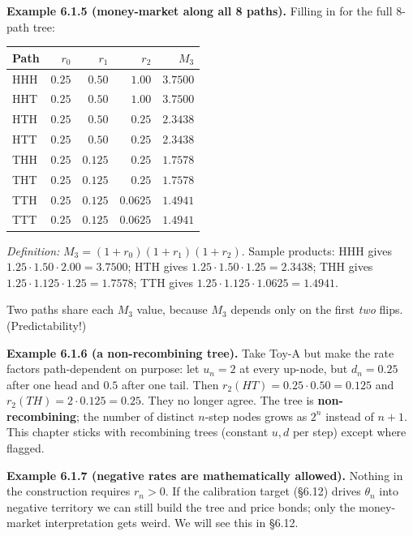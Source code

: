 \documentclass[
  10pt,
  twoside]{book}
\newcounter{none} %
\begin{document}
\textbf{Example 6.1.5 (money-market along all 8 paths).} Filling in for
the full 8-path tree:

{\def\LTcaptype{none} %
\begin{table}[H]
\centering
\begin{tabular}{|l|r|r|r|r|}
\toprule
Path & \(r_0\) & \(r_1\) & \(r_2\) & \(M_3\) \\
\midrule



HHH & \(0.25\) & \(0.50\) & \(1.00\) & \(3.7500\) \\
HHT & \(0.25\) & \(0.50\) & \(1.00\) & \(3.7500\) \\
HTH & \(0.25\) & \(0.50\) & \(0.25\) & \(2.3438\) \\
HTT & \(0.25\) & \(0.50\) & \(0.25\) & \(2.3438\) \\
THH & \(0.25\) & \(0.125\) & \(0.25\) & \(1.7578\) \\
THT & \(0.25\) & \(0.125\) & \(0.25\) & \(1.7578\) \\
TTH & \(0.25\) & \(0.125\) & \(0.0625\) & \(1.4941\) \\
TTT & \(0.25\) & \(0.125\) & \(0.0625\) & \(1.4941\) \\
\bottomrule
\end{tabular}
\end{table}
}

\emph{Definition:} \(M_3 = (1+r_0)(1+r_1)(1+r_2)\). Sample products: HHH
gives \(1.25 \cdot 1.50 \cdot 2.00 = 3.7500\); HTH gives
\(1.25 \cdot 1.50 \cdot 1.25 = 2.3438\); THH gives
\(1.25 \cdot 1.125 \cdot 1.25 = 1.7578\); TTH gives
\(1.25 \cdot 1.125 \cdot 1.0625 = 1.4941\).

Two paths share each \(M_3\) value, because \(M_3\) depends only on the
first \emph{two} flips. (Predictability!)

\textbf{Example 6.1.6 (a non-recombining tree).} Take Toy-A but make the
rate factors path-dependent on purpose: let \(u_n = 2\) at every
up-node, but \(d_n = 0.25\) after one head and \(0.5\) after one tail.
Then \(r_2(HT) = 0.25 \cdot 0.50 = 0.125\) and
\(r_2(TH) = 2 \cdot 0.125 = 0.25\). They no longer agree. The tree is
\textbf{non-recombining}; the number of distinct \(n\)-step nodes grows
as \(2^n\) instead of \(n+1\). This chapter sticks with recombining
trees (constant \(u, d\) per step) except where flagged.

\textbf{Example 6.1.7 (negative rates are mathematically allowed).}
Nothing in the construction requires \(r_n > 0\). If the calibration
target (§6.12) drives \(\theta_n\) into negative territory we can still
build the tree and price bonds; only the money-market interpretation
gets weird. We will see this in §6.12.
\end{document}
